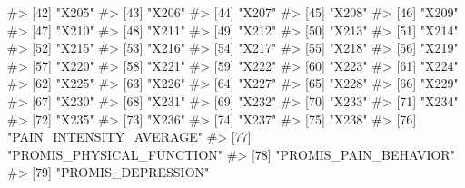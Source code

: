 \documentclass[
  letterpaper,
]{krantz}
\makeatletter
\newenvironment{Shaded}{\begin{snugshade}}{\end{snugshade}}
\newcommand{\CommentTok}[1]{\textcolor[rgb]{0.37,0.37,0.37}{#1}}
\newenvironment{kframe}{%
\medskip{}
\setlength{\fboxsep}{.8em}
 \def\at@end@of@kframe{}%
 \ifinner\ifhmode%
  \def\at@end@of@kframe{\end{minipage}}%
  \begin{minipage}{\columnwidth}%
 \fi\fi%
 \def\FrameCommand##1{\hskip\@totalleftmargin \hskip-\fboxsep
 \colorbox{shadecolor}{##1}\hskip-\fboxsep
     \hskip-\linewidth \hskip-\@totalleftmargin \hskip\columnwidth}%
 \MakeFramed {\advance\hsize-\width
   \@totalleftmargin\z@ \linewidth\hsize
   \@setminipage}}%
 {\par\unskip\endMakeFramed%
 \at@end@of@kframe}
\renewenvironment{Shaded}{\begin{kframe}}{\end{kframe}}
\makeatother
\begin{document}
\begin{Shaded}
\begin{Highlighting}[]
\CommentTok{\#\textgreater{} [42] "X205"                            }
\CommentTok{\#\textgreater{} [43] "X206"                            }
\CommentTok{\#\textgreater{} [44] "X207"                            }
\CommentTok{\#\textgreater{} [45] "X208"                            }
\CommentTok{\#\textgreater{} [46] "X209"                            }
\CommentTok{\#\textgreater{} [47] "X210"                            }
\CommentTok{\#\textgreater{} [48] "X211"                            }
\CommentTok{\#\textgreater{} [49] "X212"                            }
\CommentTok{\#\textgreater{} [50] "X213"                            }
\CommentTok{\#\textgreater{} [51] "X214"                            }
\CommentTok{\#\textgreater{} [52] "X215"                            }
\CommentTok{\#\textgreater{} [53] "X216"                            }
\CommentTok{\#\textgreater{} [54] "X217"                            }
\CommentTok{\#\textgreater{} [55] "X218"                            }
\CommentTok{\#\textgreater{} [56] "X219"                            }
\CommentTok{\#\textgreater{} [57] "X220"                            }
\CommentTok{\#\textgreater{} [58] "X221"                            }
\CommentTok{\#\textgreater{} [59] "X222"                            }
\CommentTok{\#\textgreater{} [60] "X223"                            }
\CommentTok{\#\textgreater{} [61] "X224"                            }
\CommentTok{\#\textgreater{} [62] "X225"                            }
\CommentTok{\#\textgreater{} [63] "X226"                            }
\CommentTok{\#\textgreater{} [64] "X227"                            }
\CommentTok{\#\textgreater{} [65] "X228"                            }
\CommentTok{\#\textgreater{} [66] "X229"                            }
\CommentTok{\#\textgreater{} [67] "X230"                            }
\CommentTok{\#\textgreater{} [68] "X231"                            }
\CommentTok{\#\textgreater{} [69] "X232"                            }
\CommentTok{\#\textgreater{} [70] "X233"                            }
\CommentTok{\#\textgreater{} [71] "X234"                            }
\CommentTok{\#\textgreater{} [72] "X235"                            }
\CommentTok{\#\textgreater{} [73] "X236"                            }
\CommentTok{\#\textgreater{} [74] "X237"                            }
\CommentTok{\#\textgreater{} [75] "X238"                            }
\CommentTok{\#\textgreater{} [76] "PAIN\_INTENSITY\_AVERAGE"          }
\CommentTok{\#\textgreater{} [77] "PROMIS\_PHYSICAL\_FUNCTION"        }
\CommentTok{\#\textgreater{} [78] "PROMIS\_PAIN\_BEHAVIOR"            }
\CommentTok{\#\textgreater{} [79] "PROMIS\_DEPRESSION"               }

\end{Highlighting}
\end{Shaded}
\end{document}

